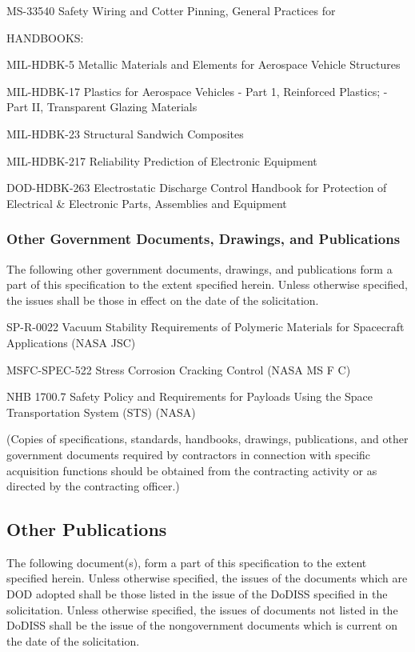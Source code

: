 \documentclass[12pt]{article}
\begin{document}
MS-33540 Safety Wiring and Cotter Pinning, General Practices for

HANDBOOKS:

MIL-HDBK-5 Metallic Materials and Elements for Aerospace Vehicle Structures

MIL-HDBK-17 Plastics for Aerospace Vehicles - Part 1, Reinforced Plastics; - Part II, Transparent Glazing Materials

MIL-HDBK-23 Structural Sandwich Composites

MIL-HDBK-217 Reliability Prediction of Electronic Equipment

DOD-HDBK-263 Electrostatic Discharge Control Handbook for Protection of Electrical \& Electronic Parts, Assemblies and Equipment

\subsubsection{Other Government Documents, Drawings, and Publications} %
The following other government documents, drawings, and publications form a part of this specification to the extent specified herein. 
Unless otherwise specified, the issues shall be those in effect on the date of the solicitation.

SP-R-0022 Vacuum Stability Requirements of Polymeric Materials for Spacecraft Applications (NASA JSC)

MSFC-SPEC-522 Stress Corrosion Cracking Control (NASA MS F C)

NHB 1700.7 Safety Policy and Requirements for Payloads Using the Space Transportation System (STS) (NASA)

(Copies of specifications, standards, handbooks, drawings, publications, and other government documents required by contractors in connection with specific acquisition functions should be obtained from the contracting activity or as directed by the contracting officer.)

\subsection{Other Publications} %
The following document(s), form a part of this specification to the extent specified herein.
Unless otherwise specified, the issues of the documents which are DOD adopted shall be those listed in the issue of the DoDISS specified in the solicitation. 
Unless otherwise specified, the issues of documents not listed in the DoDISS shall be the issue of the nongovernment documents which is current on the date of the solicitation.
\end{document}
